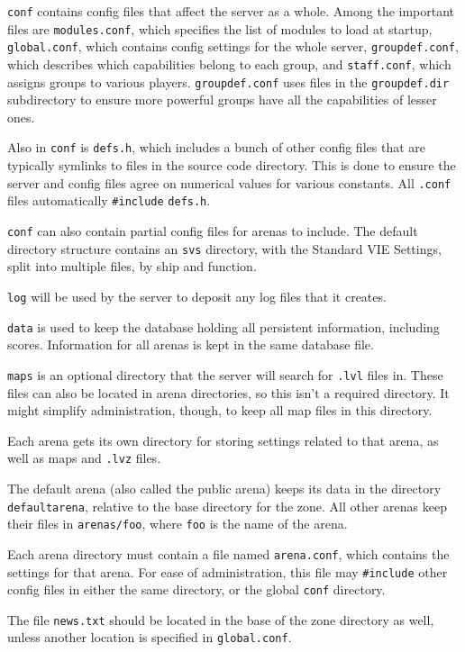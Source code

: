 \documentclass{article}
\begin{document}
\verb/conf/ contains config files that affect the server as a whole.
Among the important files are \verb/modules.conf/, which specifies the
list of modules to load at startup, \verb/global.conf/, which contains
config settings for the whole server, \verb/groupdef.conf/, which
describes which capabilities belong to each group, and
\verb/staff.conf/, which assigns groups to various players.
\verb/groupdef.conf/ uses files in the \verb/groupdef.dir/ subdirectory
to ensure more powerful groups have all the capabilities of lesser ones.

Also in \verb/conf/ is \verb/defs.h/, which includes a bunch of other
config files that are typically symlinks to files in the source code
directory. This is done to ensure the server and config files agree on
numerical values for various constants. All \verb/.conf/ files
automatically \verb/#include/ \verb/defs.h/.

\verb/conf/ can also contain partial config files for arenas to include.
The default directory structure contains an \verb/svs/ directory, with
the Standard VIE Settings, split into multiple files, by ship and
function.

\verb/log/ will be used by the server to deposit any log files that it
creates.

\verb/data/ is used to keep the database holding all persistent
information, including scores. Information for all arenas is kept in the
same database file.

\verb/maps/ is an optional directory that the server will search for
\verb/.lvl/ files in. These files can also be located in arena
directories, so this isn't a required directory. It might simplify
administration, though, to keep all map files in this directory.

Each arena gets its own directory for storing settings related to that
arena, as well as maps and \verb/.lvz/ files.

The default arena (also called the public arena) keeps its data in the
directory \verb/defaultarena/, relative to the base directory for the
zone. All other arenas keep their files in \verb|arenas/foo|, where
\verb/foo/ is the name of the arena.

Each arena directory must contain a file named \verb/arena.conf/, which
contains the settings for that arena. For ease of administration, this
file may \verb/#include/ other config files in either the same
directory, or the global \verb/conf/ directory.

The file \verb/news.txt/ should be located in the base of the zone
directory as well, unless another location is specified in
\verb/global.conf/.
\end{document}
